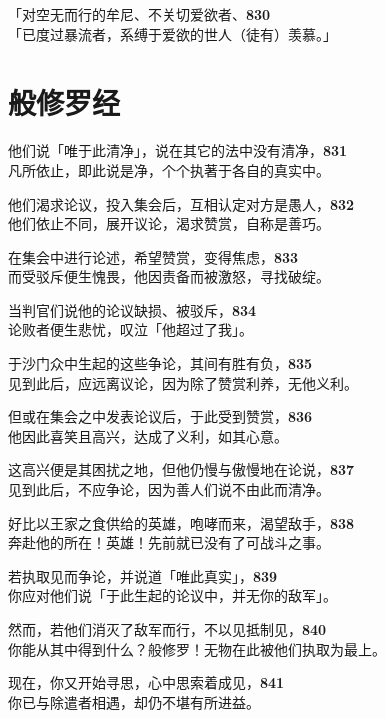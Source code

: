 「对空无而行的牟尼、不关切爱欲者、\hfill{\grayfootnotesize \textbf{830}} \\
「已度过暴流者，系缚于爱欲的世人（徒有）羡慕。」


\section{般修罗经}


他们说「唯于此清净」，说在其它的法中没有清净，\hfill{\grayfootnotesize \textbf{831}} \\
凡所依止，即此说是净，个个执著于各自的真实中。


他们渴求论议，投入集会后，互相认定对方是愚人，\hfill{\grayfootnotesize \textbf{832}} \\
他们依止不同，展开议论，渴求赞赏，自称是善巧。


在集会中进行论述，希望赞赏，变得焦虑，\hfill{\grayfootnotesize \textbf{833}} \\
而受驳斥便生愧畏，他因责备而被激怒，寻找破绽。


当判官们说他的论议缺损、被驳斥，\hfill{\grayfootnotesize \textbf{834}} \\
论败者便生悲忧，叹泣「他超过了我」。


于沙门众中生起的这些争论，其间有胜有负，\hfill{\grayfootnotesize \textbf{835}} \\
见到此后，应远离议论，因为除了赞赏利养，无他义利。


但或在集会之中发表论议后，于此受到赞赏，\hfill{\grayfootnotesize \textbf{836}} \\
他因此喜笑且高兴，达成了义利，如其心意。


这高兴便是其困扰之地，但他仍慢与傲慢地在论说，\hfill{\grayfootnotesize \textbf{837}} \\
见到此后，不应争论，因为善人们说不由此而清净。


好比以王家之食供给的英雄，咆哮而来，渴望敌手，\hfill{\grayfootnotesize \textbf{838}} \\
奔赴他的所在！英雄！先前就已没有了可战斗之事。


若执取见而争论，并说道「唯此真实」，\hfill{\grayfootnotesize \textbf{839}} \\
你应对他们说「于此生起的论议中，并无你的敌军」。


然而，若他们消灭了敌军而行，不以见抵制见，\hfill{\grayfootnotesize \textbf{840}} \\
你能从其中得到什么？般修罗！无物在此被他们执取为最上。


现在，你又开始寻思，心中思索着成见，\hfill{\grayfootnotesize \textbf{841}} \\
你已与除遣者相遇，却仍不堪有所进益。


